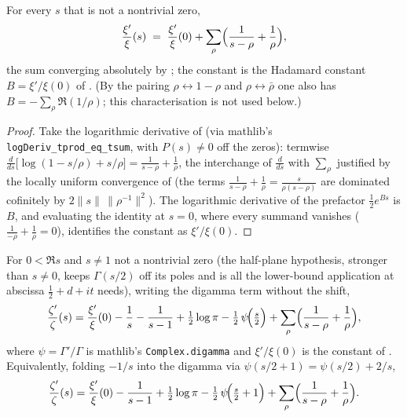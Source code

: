 \begin{lemma}
\label{lem:lb_pf_xi}
\leanok
{}
For every $s$ that is not a nontrivial zero,
\[
  \frac{\xi'}{\xi}(s)\;=\;\frac{\xi'}{\xi}(0)+\sum_\rho\Bigl(\frac1{s-\rho}+\frac1\rho\Bigr),
\]
the sum converging absolutely by ; the constant is the
Hadamard constant $B=\xi'/\xi(0)$ of . (By the pairing
$\rho\leftrightarrow1-\rho$ and $\rho\leftrightarrow\bar\rho$ one also has
$B=-\sum_\rho\Re(1/\rho)$; this characterisation is not used below.)
\end{lemma}

\begin{proof}
\leanok
{}
Take the logarithmic derivative of  (via mathlib's
\texttt{logDeriv\_tprod\_eq\_tsum}, with $P(s)\neq0$ off the zeros): termwise
$\tfrac{d}{ds}\bigl[\log(1-s/\rho)+s/\rho\bigr]=\tfrac1{s-\rho}+\tfrac1\rho$, the
interchange of $\tfrac{d}{ds}$ with $\sum_\rho$ justified by the locally uniform
convergence of  (the terms $\tfrac1{s-\rho}+\tfrac1\rho=
\tfrac{s}{\rho(s-\rho)}$ are dominated cofinitely by $2\|s\|\,\|\rho^{-1}\|^2$). The
logarithmic derivative of the prefactor $\tfrac12 e^{Bs}$ is $B$, and evaluating the
identity at $s=0$, where every summand vanishes ($\tfrac1{-\rho}+\tfrac1\rho=0$),
identifies the constant as $\xi'/\xi(0)$.
\end{proof}

\begin{lemma}
\label{lem:lb_pf_zeta}
\leanok
{}
For $0<\Re s$ and $s\neq1$ not a nontrivial zero (the half-plane hypothesis, stronger
than $s\neq0$, keeps $\Gamma(s/2)$ off its poles and is all the lower-bound application
at abscissa $\tfrac12+d+it$ needs), writing the digamma term without the shift,
\[
  \frac{\zeta'}{\zeta}(s)
  = \frac{\xi'}{\xi}(0)-\frac1s-\frac1{s-1}+\tfrac12\log\pi
    -\tfrac12\,\psi\!\Bigl(\tfrac s2\Bigr)
    +\sum_\rho\Bigl(\frac1{s-\rho}+\frac1\rho\Bigr),
\]
where $\psi=\Gamma'/\Gamma$ is mathlib's \texttt{Complex.digamma} and $\xi'/\xi(0)$ is
the constant of . Equivalently, folding $-1/s$ into the digamma via
$\psi(s/2+1)=\psi(s/2)+2/s$,
\[
  \frac{\zeta'}{\zeta}(s)
  = \frac{\xi'}{\xi}(0)-\frac1{s-1}+\tfrac12\log\pi-\tfrac12\,\psi\!\Bigl(\tfrac s2+1\Bigr)
    +\sum_\rho\Bigl(\frac1{s-\rho}+\frac1\rho\Bigr).
\]
\end{lemma}

